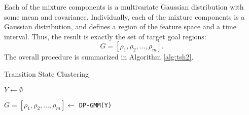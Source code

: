 Each of the mixture components is a multivariate Gaussian distribution with some mean and covariance.
Individually, each of the mixture components is a Gaussian distribution, and defines a region of the feature space and a time interval.
Thus, the result is exactly the set of target goal regions:
\[
G = [\rho_1, \rho_2,...,\rho_m].
\]
The overall procedure is summarized in Algorithm \ref{alg:tsh2}.

\begin{algorithm}[t]
\small
\DontPrintSemicolon
\caption{Transition State Clustering \label{alg:tsh2}}

$Y \leftarrow \emptyset$

$G = [\rho_1, \rho_2,...,\rho_m]\leftarrow$ \texttt{DP-GMM(Y)}

\end{algorithm}

%